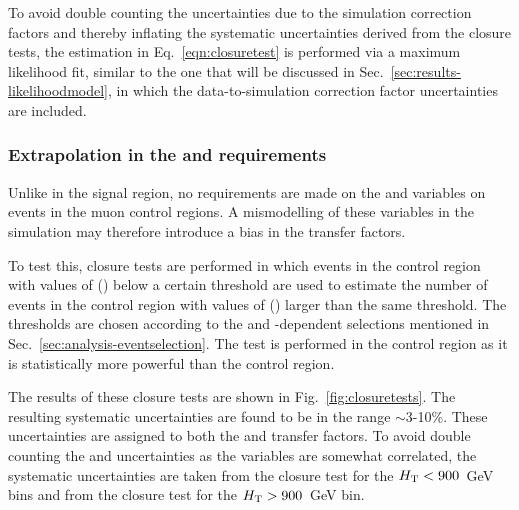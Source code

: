 To avoid double counting the uncertainties due to the simulation correction 
factors and thereby inflating the systematic uncertainties derived from the 
closure tests, the estimation in Eq.~\ref{eqn:closuretest} is performed via a 
maximum likelihood fit, similar to the one that will be discussed in 
Sec.~\ref{sec:results-likelihoodmodel}, in which the data-to-simulation 
correction factor uncertainties are included.

\subsubsection{Extrapolation in the \alphat and \bdphi requirements}
Unlike in the signal region, no requirements are made on the \alphat and \bdphi 
variables on events in the muon control regions. A mismodelling of these 
variables in the simulation may therefore introduce a bias in the transfer 
factors.

To test this, closure tests are performed in which events in the \mj control 
region with values of \alphat (\bdphi) below a certain threshold are used to 
estimate the number of events in the \mj control region with values of \alphat 
(\bdphi) larger than the same threshold. The thresholds are chosen according to 
the \bdphi and \scalht-dependent selections mentioned in 
Sec.~\ref{sec:analysis-eventselection}. The test is performed in the \mj 
control region as it is statistically more powerful than the \mmj control 
region.

The results of these closure tests are shown in Fig.~\ref{fig:closuretests}. 
The resulting systematic uncertainties are found to be in the range 
$\sim$3-10\%. These uncertainties are assigned to both the \Tmutottw and 
\Tmumutoz transfer factors. To avoid double counting the \alphat and \bdphi 
uncertainties as the variables are somewhat correlated, the systematic 
uncertainties are taken from the \alphat closure test for the $\mbox{$H_\text{T}$}<900$~GeV 
bins and from the \bdphi closure test for the $\mbox{$H_\text{T}$}>900$~GeV bin.

